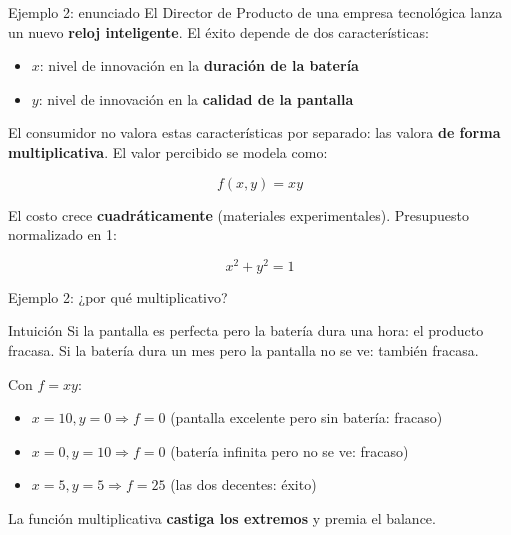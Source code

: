 \documentclass{beamer}
\begin{document}
\begin{frame}{Ejemplo 2: enunciado}
    \small
    El Director de Producto de una empresa tecnológica lanza un nuevo \textbf{reloj inteligente}. El éxito depende de dos características:
    \begin{itemize}
        \item $x$: nivel de innovación en la \textbf{duración de la batería}
        \item $y$: nivel de innovación en la \textbf{calidad de la pantalla}
    \end{itemize}

    \vspace{0.5em}

    El consumidor no valora estas características por separado: las valora \textbf{de forma multiplicativa}. El valor percibido se modela como:

    \[
    f(x, y) = xy
    \]

    \vspace{0.3em}

    El costo crece \textbf{cuadráticamente} (materiales experimentales). Presupuesto normalizado en 1:

    \[
    x^2 + y^2 = 1
    \]
\end{frame}

\begin{frame}{Ejemplo 2: ¿por qué multiplicativo?}
    \small
    \begin{alertblock}{Intuición}
        Si la pantalla es perfecta pero la batería dura una hora: el producto fracasa. Si la batería dura un mes pero la pantalla no se ve: también fracasa.
    \end{alertblock}

    \vspace{0.8em}

    Con $f = xy$:
    \begin{itemize}
        \item $x = 10, y = 0 \Rightarrow f = 0$ (pantalla excelente pero sin batería: fracaso)
        \item $x = 0, y = 10 \Rightarrow f = 0$ (batería infinita pero no se ve: fracaso)
        \item $x = 5, y = 5 \Rightarrow f = 25$ (las dos decentes: éxito)
    \end{itemize}

    \vspace{0.5em}

    La función multiplicativa \textbf{castiga los extremos} y premia el balance.
\end{frame}
\end{document}
